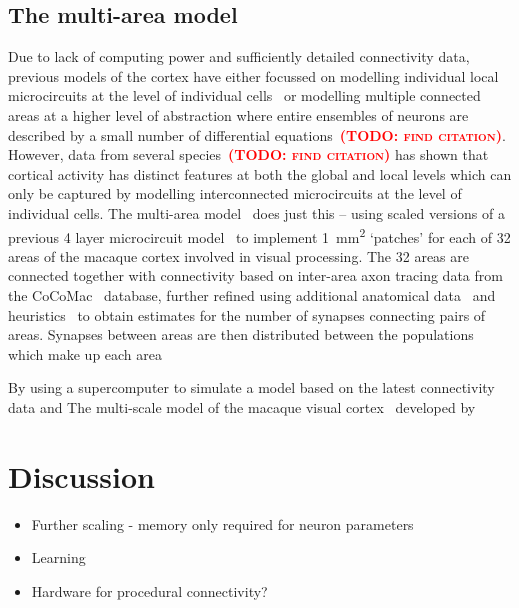 \documentclass[9pt,twocolumn,twoside,lineno]{pnas-new}
\newcommand{\todo}[1]{\textbf{\textsc{\textcolor{red}{(TODO: #1)}}}}
\begin{document}
\subsection*{The multi-area model}
Due to lack of computing power and sufficiently detailed connectivity data, previous models of the cortex have either focussed on modelling individual local microcircuits at the level of individual cells~\citep{Izhikevich2008,Potjans2012} or modelling multiple connected areas at a higher level of abstraction where entire ensembles of neurons are described by a small number of differential equations~\todo{find citation}.
However, data from several species~\todo{find citation} has shown that cortical activity has distinct features at both the global and local levels which can only be captured by modelling interconnected microcircuits at the level of individual cells.
The multi-area model~\citep{Schmidt2018a,Schmidt2018} does just this -- using scaled versions of a previous 4 layer microcircuit model~\citep{Potjans2012} to implement \SI{1}{\milli\meter\squared} `patches' for each of 32 areas of the macaque cortex involved in visual processing.
The 32 areas are connected together with connectivity based on inter-area axon tracing data from the CoCoMac~\citep{Bakker2012} database, further refined using additional anatomical data~\citep{Markov2014} and heuristics~\citep{Ercsey-Ravasz2013} to obtain estimates for the number of synapses connecting pairs of areas.
Synapses between areas are then distributed between the populations which make up each area 

By using a supercomputer to simulate a model based on the latest connectivity data and The multi-scale model of the macaque visual cortex~\citep{Schmidt2018} developed by 


\section*{Discussion}
\begin{itemize}
    \item Further scaling - memory only required for neuron parameters
    \item Learning
    \item Hardware for procedural connectivity?
\end{itemize}


\end{document}
